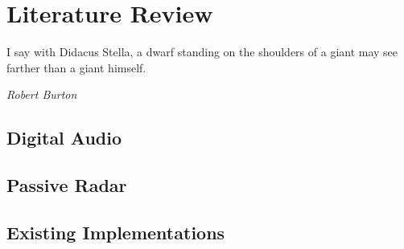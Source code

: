 \documentclass[class=report,11pt,crop=false]{standalone}
\begin{document}
\chapter{Literature Review}
\epigraph{I say with Didacus Stella, a dwarf standing on the shoulders of a giant may see farther than a giant himself.}%
    {\emph{Robert Burton}}

\section{Digital Audio}

\blindmathpaper

\section{Passive Radar}

\blindmathpaper

\section{Existing Implementations}

\blindmathpaper













\ifstandalone

\fi
\end{document}
